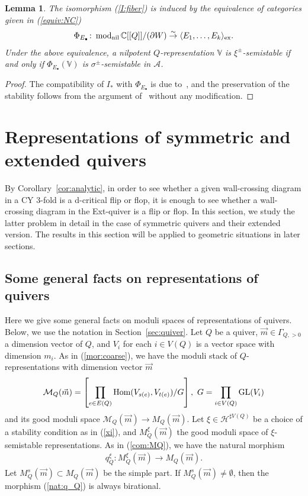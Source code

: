 \documentclass[11pt]{amsart}
\theoremstyle{plain}
\newtheorem{lem}[thm]{Lemma}
\theoremstyle{definition}
\theoremstyle{remark}
\newcommand{\aA}{\mathcal{A}}
\newcommand{\hH}{\mathcal{H}}
\newcommand{\mM}{\mathcal{M}}
\newcommand{\Hom}{\mathop{\rm Hom}\nolimits}
\newcommand{\modu}{\mathop{\rm mod}\nolimits}
\newcommand{\GL}{\mathop{\rm GL}\nolimits}
\begin{document}
\begin{lem}\label{lem:category}
The isomorphism 
(\ref{I:fiber}) is induced by 
the equivalence of categories 
given in (\ref{equiv:NC})
\begin{align}\label{Istar:eq}
\Phi_{E_{\bullet}} \colon 
\modu_{\rm{nil}}\mathbb{C}[[Q]]/(\partial W) \stackrel{\sim}{\to}
\langle E_1, \ldots, E_k \rangle_{\rm{ex}}.
\end{align}
Under the above equivalence, 
a nilpotent 
$Q$-representation
$\mathbb{V}$ is $\xi^{\pm}$-semistable 
if and only if $\Phi_{E_{\bullet}}(\mathbb{V})$ is 
$\sigma^{\pm}$-semistable in $\aA$. 
\end{lem}
\begin{proof}
The compatibility of $I_{\ast}$ with 
$\Phi_{E_{\bullet}}$ is due 
to~\cite[Theorem~6.8]{Todstack}, and the preservation 
of the stability follows from 
the argument of~\cite[Lemma~7.8]{Todstack}
without any modification.
\end{proof}


\section{Representations of symmetric and extended quivers}
\label{sec:repsym}
By Corollary~\ref{cor:analytic}, 
in order to see whether a given 
wall-crossing diagram in a CY 3-fold is a d-critical flip or flop, 
it is enough to 
see whether a wall-crossing diagram 
in the Ext-quiver
is a flip or flop. 
In this section, we 
study the latter problem in detail 
in the case of 
symmetric quivers and 
their extended version.
The results in this section will be applied to 
geometric situations in later sections. 

\subsection{Some general facts on representations of quivers}
Here 
we give some general facts on 
moduli spaces of representations of quivers. 
Below, 
we use the notation in Section~\ref{sec:quiver}. 
Let $Q$ be a quiver, 
$\vec{m} \in \Gamma_{Q, >0}$ a dimension vector
of $Q$, and $V_i$ for each $i \in V(Q)$
is a vector space with 
dimension $m_i$.  
As in (\ref{mor:coarse}), we have the 
moduli stack 
of 
$Q$-representations
with dimension vector $\vec{m}$
\begin{align}\label{stack:MQ}
\mM_Q(\vec{m})=\left[ \prod_{e \in E(Q)} \Hom(V_{s(e)}, V_{t(e)})
/G  \right], \ 
G=\prod_{i \in V(Q)} \GL(V_i)
\end{align}
and its 
good moduli space 
$\mM_Q(\vec{m}) \to M_Q(\vec{m})$. 
Let $\xi \in \hH^{\sharp V(Q)}$ be a choice 
of a stability condition 
as in (\ref{xi}), 
and $M_Q^{\xi}(\vec{m})$ the 
good moduli space of $\xi$-semistable representations.
As in (\ref{com:MQ}),
we have the natural morphism
\begin{align}\label{nat:q_Q}
q_Q^{\xi} \colon M_Q^{\xi}(\vec{m}) \to M_Q(\vec{m}).
\end{align} 
Let $M_Q^s(\vec{m}) \subset M_Q(\vec{m})$ be
the simple part. 
If $M_Q^s(\vec{m}) \neq \emptyset$, then 
the morphism (\ref{nat:q_Q}) is always birational. 
\end{document}
